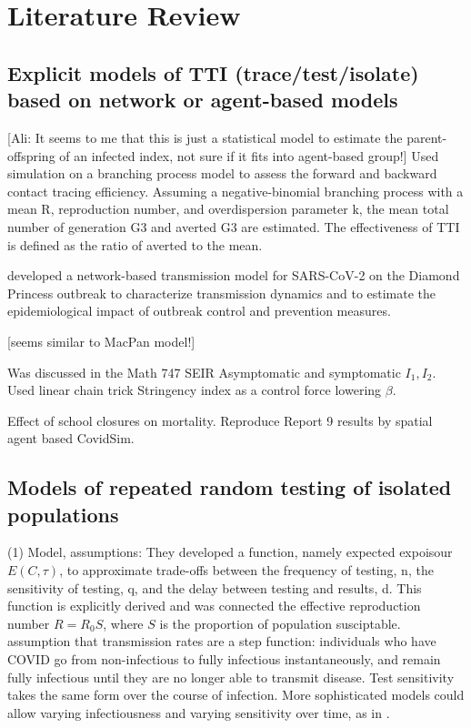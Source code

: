 \documentclass{article}\usepackage[]{graphicx}\usepackage[]{color}
\begin{document}
\section{Literature Review}

\subsection{Explicit models of TTI (trace/test/isolate) based on network or agent-based models}

\citep{endo2020implication} [Ali: It seems to me that this is just a statistical model to estimate the parent-offspring of an infected index, not sure if it fits into agent-based group!] Used simulation on a branching process model to assess the forward and backward contact tracing efficiency. Assuming a negative-binomial branching process with a mean R, reproduction number, and overdispersion parameter k, the mean total number of generation G3 and averted G3 are estimated. The effectiveness of TTI is defined as the ratio of averted to the mean.

\citep{jenness2020modeling} developed a network-based transmission model for SARS-CoV-2 on the Diamond Princess outbreak to characterize transmission dynamics and to estimate the epidemiological impact of outbreak control and prevention measures. 

\citep{elbanna2020entry} [seems similar to MacPan model!]

\citep{de2020influenza} Was discussed in the Math 747 
SEIR Asymptomatic and symptomatic $I_1, I_2$. Used linear chain trick 
Stringency index as a control force lowering $\beta$.

\citep{rice2020effect} Effect of school closures on mortality. Reproduce Report 9 results by spatial agent based CovidSim. 
\subsection{Models of repeated random testing of isolated populations}
\cite{bergstrom2020frequency}
(1) Model, assumptions: They developed a function, namely expected expoisour $E(C,\tau)$, to approximate trade-offs between the frequency of testing, n, the sensitivity of testing, q, and the delay between
testing and results, d. This function is explicitly derived and was connected the effective reproduction number $R=R_0 S$, where $S$ is the proportion of population susciptable.
assumption that transmission rates are a step function: individuals who
have COVID go from non-infectious to fully infectious instantaneously,
and remain fully infectious until they are no longer able to transmit disease. Test sensitivity takes the same form over the course of infection.
More sophisticated models could allow varying infectiousness and varying
sensitivity over time, as in 
\citep{larremore2020test}.
\end{document}

